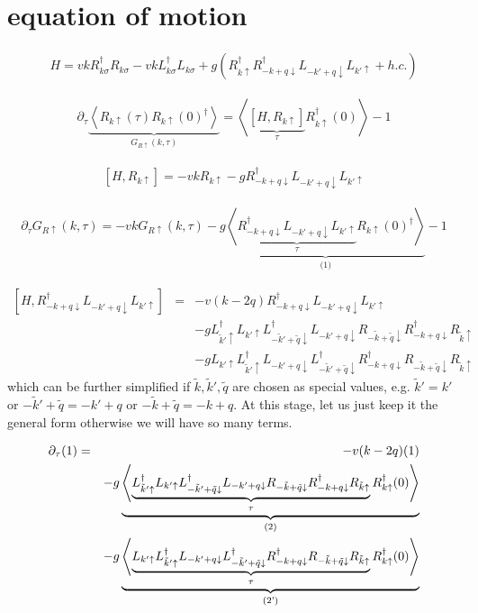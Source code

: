 \documentclass[10pt]{article}
\newcommand{\bea}{\begin{eqnarray}}
\newcommand{\eea}{\end{eqnarray}}
\begin{document}
\section{equation of motion}
\bea H=vk R_{k\sigma}^\dag R_{k\sigma}-vk L_{k\sigma}^\dag L_{k\sigma} + g(R_{k\uparrow}^\dag R_{-k+q\downarrow}^\dag L_{-k'+q\downarrow} L_{k'\uparrow} + h.c.) \eea

\bea \partial_\tau\underbrace{\left\langle R_{k\uparrow}(\tau) R_{k\uparrow}(0)^\dag \right\rangle}_{G_{R\uparrow}(k,\tau)} = \left\langle \underbrace{\left[H,R_{k\uparrow}\right]}_{\tau}  R_{k\uparrow}^\dag(0)\right\rangle - 1 \eea

\bea \left[ H,R_{k\uparrow} \right] = -vkR_{k\uparrow}-gR_{-k+q\downarrow}^\dag L_{-k'+q\downarrow} L_{k'\uparrow} \eea

\bea \partial_\tau G_{R\uparrow}(k,\tau) = -vkG_{R\uparrow}(k,\tau) -g \underbrace{\left\langle \underbrace{R_{-k+q\downarrow}^\dag L_{-k'+q\downarrow} L_{k'\uparrow}}_{\tau} R_{k\uparrow}(0)^\dag  \right\rangle}_{\text{(1)}} -1 \eea  


\bea \left[H,R_{-k+q\downarrow}^\dag L_{-k'+q\downarrow} L_{k'\uparrow}\right]&=& -v(k-2q)R_{-k+q\downarrow}^\dag L_{-k'+q\downarrow} L_{k'\uparrow} \nonumber\\
&&-g L_{\tilde{k}'\uparrow}^\dag L_{k'\uparrow} L_{-\tilde{k}'+\tilde{q}\downarrow}^\dag L_{-k'+q\downarrow} R_{-\tilde{k}+\tilde{q}\downarrow} R_{-k+q\downarrow}^\dag R_{\tilde{k}\uparrow} \nonumber\\
&&-g L_{k'\uparrow} L_{\tilde{k}'\uparrow}^\dag L_{-k'+q\downarrow} L_{-\tilde{k}'+\tilde{q}\downarrow}^\dag R_{-k+q\downarrow}^\dag R_{-\tilde{k}+\tilde{q}\downarrow} R_{\tilde{k}\uparrow}
\eea
which can be further simplified if $\tilde{k},\tilde{k}',\tilde{q}$ are chosen as special values, e.g. $\tilde{k}'=k'$ or $-\tilde{k}'+\tilde{q}=-k'+q$ or $-\tilde{k}+\tilde{q}=-k+q$. At this stage, let us just keep it the general form otherwise we will have so many terms. 

\bea \partial_\tau\text{(1)}&=&-v(k-2q){\text(1)} \nonumber\\
&&-g\underbrace{\left\langle \underbrace{L_{\tilde{k}'\uparrow}^\dag L_{k'\uparrow} L_{-\tilde{k}'+\tilde{q}\downarrow}^\dag L_{-k'+q\downarrow} R_{-\tilde{k}+\tilde{q}\downarrow} R_{-k+q\downarrow}^\dag R_{\tilde{k}\uparrow}}_{\tau} R_{k\uparrow}^\dag(0) \right\rangle}_{\text{(2)}} \nonumber\\
&&-g\underbrace{\left\langle \underbrace{L_{k'\uparrow} L_{\tilde{k}'\uparrow}^\dag L_{-k'+q\downarrow} L_{-\tilde{k}'+\tilde{q}\downarrow}^\dag R_{-k+q\downarrow}^\dag R_{-\tilde{k}+\tilde{q}\downarrow} R_{\tilde{k}\uparrow}}_{\tau} R_{k\uparrow}^\dag(0) \right\rangle}_{\text{(2')}} \eea 
\end{document}
